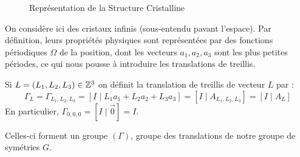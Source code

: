 \documentclass{cours}
\begin{document}
\begin{figure}[ht]
    \centering
    \caption{Représentation de la Structure Cristalline}
    \label{fig:cristal_def}
\end{figure}

On considère ici des cristaux infinis (sous-entendu pavant l'espace). Par définition, leurs propriétés physiques sont représentées par des fonctions périodiques $\Omega$ de la position, dont les vecteurs $a_{1}, a_{2}, a_{3}$ sont les plus petites périodes, ce qui nous pousse à introduire les translations de treillis.
\begin{definition}\label{def:treillis}
    Si $L = (L_{1}, L_{2}, L_{3}) \in \mathbb{Z}^{3}$ on définit la translation de treillis de vecteur $L$ par :
    \begin{equation}
        \Gamma_{L} = \Gamma_{L_{1}, L_{2}, L_{3}} = \left[I \mid L_{1}a_{1} + L_{2}a_{2} + L_{3}a_{3}\right] = \left[I \mid A_{L_1, L_2, L_3}\right] = \left[I \mid A_{L}\right]
    \end{equation}
    En particulier, $\Gamma_{0, 0, 0} = \left[I \mid \vec{0}\right] = I$.
\end{definition}
Celles-ci forment un groupe $(\Gamma)$, groupe des translations de notre groupe de symétries $G$.\\
\end{document}
